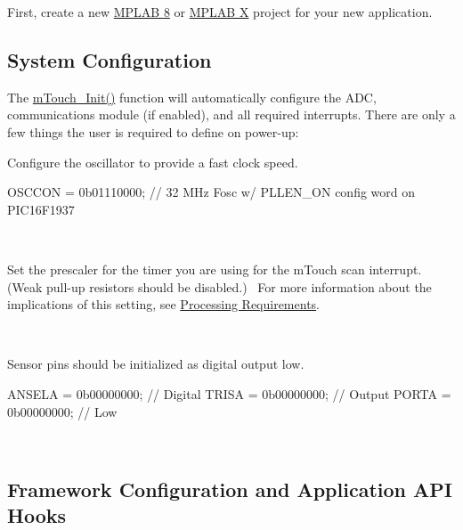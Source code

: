 First, create a new \hyperlink{GettingStartedNewP8}{M\+P\+L\+A\+B 8} or \hyperlink{GettingStartedNewPX}{M\+P\+L\+A\+B X} project for your new application.\hypertarget{_getting_started_custom_GS_SysConfig}{}\subsection{System Configuration}\label{_getting_started_custom_GS_SysConfig}
The \hyperlink{m_touch_8c_ab73968cbb19d4ae25a65698c15906b65}{m\+Touch\+\_\+\+Init()} function will automatically configure the A\+D\+C, communications module (if enabled), and all required interrupts. There are only a few things the user is required to define on power-\/up\+: 
\begin{DoxyEnumerate}
\item Configure the oscillator to provide a fast clock speed. 
\begin{DoxyCode}
OSCCON = 0b01110000;       \textcolor{comment}{// 32 MHz Fosc w/ PLLEN\_ON config word on PIC16F1937}
\end{DoxyCode}
 ~\newline
 
\item Set the prescaler for the timer you are using for the m\+Touch scan interrupt. (Weak pull-\/up resistors should be disabled.)~\newline
 For more information about the implications of this setting, see \hyperlink{_resource_requirements_rrMemory}{Processing Requirements}. 
 ~\newline
 
\item Sensor pins should be initialized as digital output low. 
\begin{DoxyCode}
ANSELA = 0b00000000;       \textcolor{comment}{// Digital}
TRISA  = 0b00000000;       \textcolor{comment}{// Output}
PORTA  = 0b00000000;       \textcolor{comment}{// Low   }
\end{DoxyCode}
 
\end{DoxyEnumerate}~\newline
 \hypertarget{_getting_started_custom_GS_InitConfig}{}\subsection{Framework Configuration and Application A\+P\+I Hooks}\label{_getting_started_custom_GS_InitConfig}
